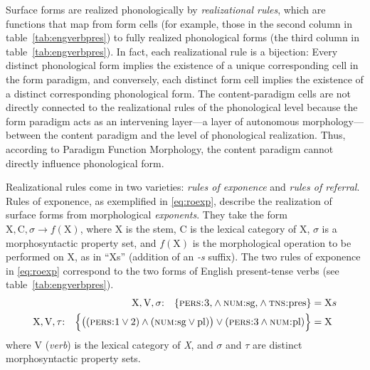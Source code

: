 Surface forms are realized phonologically by \emph{realizational rules}, which 
are functions that map from form cells (for example, those in the second column in table~\ref{tab:engverbpres})
to fully realized phonological forms (the third column in table~\ref{tab:engverbpres}). 
In fact, each realizational rule is a bijection: Every 
distinct phonological form implies the existence of a unique corresponding cell in 
the form paradigm, and conversely, each distinct form cell implies the existence of 
a distinct corresponding phonological form. The
content-paradigm cells are not directly connected to the realizational rules of 
the phonological level because the form paradigm acts as an 
intervening layer---a layer of autonomous morphology---between the 
content paradigm and the level of phonological realization. 
Thus, according to Paradigm Function Morphology, the content paradigm cannot directly influence phonological form. 

Realizational rules come in two varieties:
\emph{rules of exponence} and \emph{rules of referral}. Rules of exponence, as exemplified in \eqref{eq:roexp}, describe the 
realization of surface forms from morphological \emph{exponents}. They take the form 
$\text{X},\text{C},\sigma \to f(\text{X})$, where X is the stem, C is the lexical category of X, 
$\sigma$ is a morphosyntactic property set,  and $f(\text{X})$ is the morphological operation to be performed 
on X, as in ``Xs'' (addition of an \emph{-s} suffix). The two rules of exponence in \eqref{eq:roexp}  
correspond to the two forms 
of English present-tense verbs (see table~\ref{tab:engverbpres}). 
\begin{align}
\label{eq:roexp}
	\text{X},\text{V},\sigma\text{:} \quad
	\{ \textsc{pers:3}\text{,} \land \textsc{num:}\text{sg,} \land \textsc{tns:}\text{pres} \} &= \text{X}s \\ 
	\text{X},\text{V},\tau\text{:} \quad
\Big\{ \big((\textsc{pers:}\text{1}\vee\text{2}) \land (\textsc{num:}\text{sg} \vee \text{pl})\big) 
\vee (\textsc{pers:}\text{3}\land \textsc{num:}\text{pl}) \Big\} %
&= \text{X} 
\end{align}
where $\text{V}$ (\textit{verb}) is the lexical category of \textit{X},
and $\sigma$ and $\tau$ are distinct morphosyntactic property sets. 

